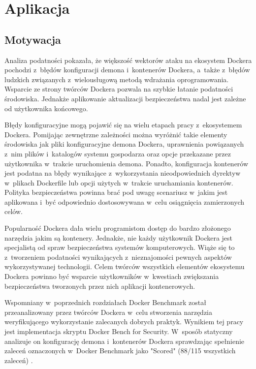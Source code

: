\chapter{Aplikacja}

\section{Motywacja}

Analiza podatności pokazała, że większość wektorów ataku na ekosystem Dockera pochodzi z~błędów konfiguracji demona i~kontenerów Dockera, a~także z~błędów ludzkich związanych z~wielousługową metodą wdrażania oprogramowania. Wsparcie ze strony twórców Dockera pozwala na szybkie łatanie podatności środowiska. Jednakże aplikowanie aktualizacji bezpieczeństwa nadal jest zależne od użytkownika końcowego.

Błędy konfiguracyjne mogą pojawić się na wielu etapach pracy z~ekosystemem Dockera. Pomijając zewnętrzne zależności można wyróżnić takie elementy środowiska jak pliki konfiguracyjne demona Dockera, uprawnienia powiązanych z~nim plików i~katalogów systemu gospodarza oraz opcje przekazane przez użytkownika w~trakcie uruchomienia demona. Ponadto, konfiguracja kontenerów jest podatna na błędy wynikające z~wykorzystania nieodpowiednich dyrektyw w~plikach Dockerfile lub opcji użytych w~trakcie uruchamiania kontenerów. Polityka bezpieczeństwa powinna brać pod uwagę scenariusz w~jakim jest aplikowana i~być odpowiednio dostosowywana w~celu osiągnięcia zamierzonych celów.

Popularność Dockera dała wielu programistom dostęp do bardzo złożonego narzędzia jakim są kontenery. Jednakże, nie każdy użytkownik Dockera jest specjalistą od spraw bezpieczeństwa systemów komputerowych. Wiąże się to z~tworzeniem podatności wynikających z~nieznajomości pewnych aspektów wykorzystywanej technologii. Celem twórców wszystkich elementów ekosystemu Dockera powinno być wsparcie użytkowników w~kwestiach zwiększania bezpieczeństwa tworzonych przez nich aplikacji kontenerowych. 

Wspomniany w~poprzednich rozdziałach Docker Benchmark \cite{CISDockerBenchmark} został przeanalizowany przez twórców Dockera w~celu stworzenia narzędzia weryfikującego wykorzystanie zalecanych dobrych praktyk. Wynikiem tej pracy jest implementacja skryptu Docker Bench for Security. W~sposób statyczny analizuje on konfigurację demona i~kontenerów Dockera sprawdzając spełnienie zaleceń oznaczonych w~Docker Benchmark jako "Scored" (88/115 wszystkich zaleceń) \cite{DockerBenchSecurity}.

